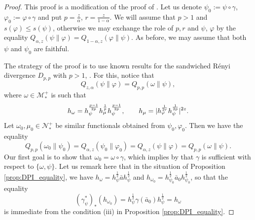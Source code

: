 \documentclass[12pt]{article}
\theoremstyle{definition}
\theoremstyle{remark}
\numberwithin{equation}{section}
\def\Me{\mathcal M}
\def\Ne{\mathcal N}
\def\ffi{\varphi}
\begin{document}
\begin{proof} This proof is a modification of the proof of \cite[Thm.
5.1]{jencova2021renyi}. Let us denote $\psi_0:=\psi\circ\gamma$,
$\varphi_0:=\varphi\circ\gamma$ and put $p=\frac{z}{\alpha}$, $r=\frac{z}{1-\alpha}$.  
We will assume that $p>1$ and $s(\ffi)\le s(\psi)$,
otherwise we may exchange the role of $p,r$ and $\psi$, $\ffi$ by the equality
$Q_{\alpha,z}(\psi\|\varphi)=Q_{1-\alpha,z}(\varphi\|\psi)$. As before, we may assume that
both $\psi$ and $\psi_0$ are faithful.

The strategy of the proof is to use known results for the sandwiched R\'enyi divergence
$D_{p,p}$ with $p>1$, \cite[]{jencova2018renyi}. For this, notice that
\[
Q_{z,\alpha}(\psi\|\ffi)=Q_{p,p}(\omega\|\psi),
\]
where $\omega\in \Me_*^+$ is such that
\begin{equation}\label{eq:omega}
h_\omega=h_\psi^{p-1\over 2p}h_\mu^{\frac1p}h_\psi^{p-1\over 2p},\qquad
h_{\mu}=|h_{\ffi}^{1\over 2r}h_{\psi}^{1\over 2p}|^{2z}.
\end{equation}
Let $\omega_0,\mu_0\in \Ne_*^+$ be similar functionals obtained from $\psi_0,\ffi_0$. Then
we have the equality
\[
Q_{p,p}(\omega_0\|\psi_0)=Q_{\alpha,z}(\psi_0\|\ffi_0)=Q_{\alpha,z}(\psi\|\ffi)=Q_{p,p}(\omega\|\psi).
\]
Our first goal is to show that $\omega_0=\omega\circ\gamma$, which implies by
\cite[]{jencova2018renyi} that $\gamma$ is sufficient with respect to $\{\omega,\psi\}$. Let us remark here that in the situation of Proposition \ref{prop:DPI_equality}, we have
$h_\omega=h_\psi^{\frac12}\bar ah_\psi^{\frac12}$ and
$h_{\omega_0}=h_{\psi_0}^{\frac12}\bar a_0h_{\psi_0}^{\frac12}$, so that the equality
\[
(\gamma^*_{\psi})_*(h_{\omega_0})=h_\psi^{\frac12}\gamma(\bar
a_0)h_\psi^{\frac12}=h_\omega
\]
is immediate from the condition (iii) in Proposition \ref{prop:DPI_equality}.




\end{proof}
\end{document}
